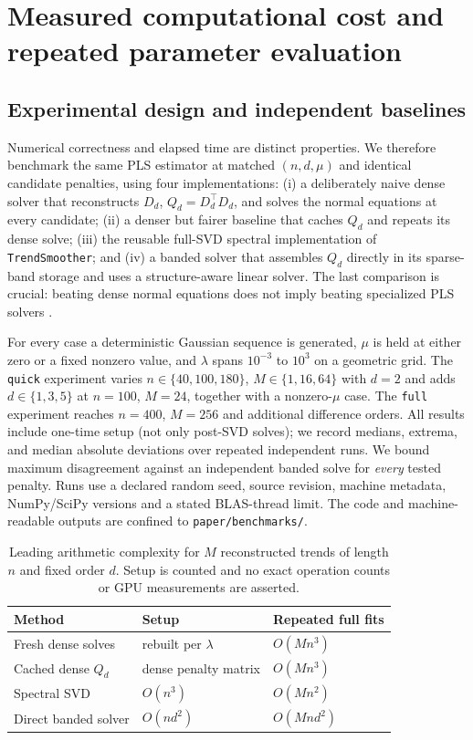 \section{Measured computational cost and repeated parameter evaluation}
\subsection{Experimental design and independent baselines}
Numerical correctness and elapsed time are distinct properties. We
therefore benchmark the same PLS estimator at matched $(n,d,\mu)$
and identical candidate penalties, using four implementations:
(i) a deliberately naive dense solver that reconstructs $D_d$,
$Q_d=D_d^\top D_d$, and solves the normal equations at every
candidate; (ii) a denser but fairer baseline that caches $Q_d$ and
repeats its dense solve; (iii) the reusable full-SVD spectral
implementation of \texttt{TrendSmoother}; and (iv) a banded solver
that assembles $Q_d$ directly in its sparse-band storage and uses
a structure-aware linear solver. The last comparison is crucial:
beating dense normal equations does not imply beating specialized
PLS solvers \cite{weinert2007wh}.

For every case a deterministic Gaussian sequence is generated,
$\mu$ is held at either zero or a fixed nonzero value, and
$\lambda$ spans $10^{-3}$ to $10^3$ on a geometric grid.
The \texttt{quick} experiment varies $n\in\{40,100,180\}$,
$M\in\{1,16,64\}$ with $d=2$ and adds
$d\in\{1,3,5\}$ at $n=100$, $M=24$, together
with a nonzero-$\mu$ case. The \texttt{full} experiment reaches
$n=400$, $M=256$ and additional difference orders.
All results include one-time setup (not only post-SVD solves);
we record medians, extrema, and median absolute deviations over
repeated independent runs. We bound maximum disagreement against
an independent banded solve for \emph{every} tested penalty.
Runs use a declared random seed, source revision, machine
metadata, NumPy/SciPy versions and a stated BLAS-thread limit.
The code and machine-readable outputs are confined to
\texttt{paper/benchmarks/}.

\begin{table}[tbp]
\centering
\caption{Leading arithmetic complexity for $M$ reconstructed
trends of length $n$ and fixed order $d$. Setup is counted
and no exact operation counts or GPU measurements are asserted.}
\label{tab:complexity}
\begin{tabular}{lll}
\toprule
Method & Setup & Repeated full fits \\
\midrule
Fresh dense solves & rebuilt per $\lambda$ & $O(Mn^3)$ \\
Cached dense $Q_d$ & dense penalty matrix & $O(Mn^3)$ \\
Spectral SVD & $O(n^3)$ & $O(Mn^2)$ \\
Direct banded solver & $O(nd^2)$ & $O(Mnd^2)$ \\
\bottomrule
\end{tabular}
\end{table}

